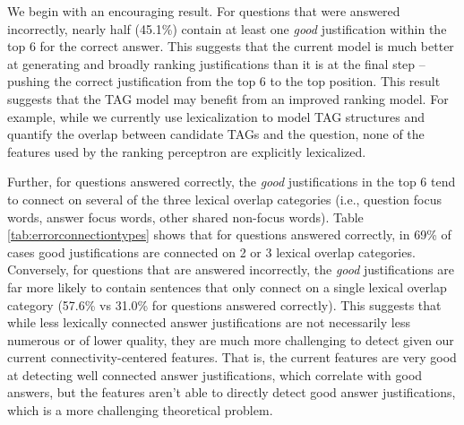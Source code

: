 {}
We begin with an encouraging result. For questions that were answered incorrectly, nearly half (45.1\%) contain at least one \emph{good} justification within the top 6 for the correct answer.  This suggests that the current model is much better at generating and broadly ranking justifications than it is at the final step -- pushing the correct justification from the top 6 to the top position.  This result suggests that the TAG model may benefit from an improved ranking model. For example, while we currently use lexicalization to model TAG structures and quantify the overlap between candidate TAGs and the question, none of the features used by the ranking perceptron are explicitly lexicalized. 


Further, for questions answered correctly, the \emph{good} justifications in the top 6 tend to connect on several of the three lexical overlap categories (i.e., question focus words, answer focus words, other shared non-focus words).  Table \ref{tab:errorconnectiontypes} shows that for questions answered correctly, in 69\% of cases good justifications are connected on 2 or 3 lexical overlap categories.  
Conversely, for questions that are answered incorrectly, the \emph{good} justifications are far more likely to contain sentences that only connect on a single lexical overlap category (57.6\% vs 31.0\% for questions answered correctly). 
This suggests that while less lexically connected answer justifications are not necessarily less numerous or of lower quality, they are much more challenging to detect given our current connectivity-centered features.  That is, the current features are very good at detecting well connected answer justifications, which correlate with good answers, but the features aren't able to directly detect good answer justifications, which is a more challenging theoretical problem.




